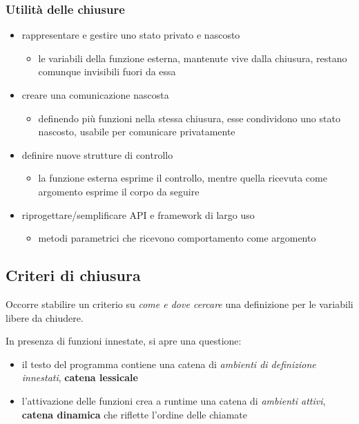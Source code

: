 \subsubsection{Utilità delle chiusure}
\begin{itemize}
    \item rappresentare e gestire uno stato privato e nascosto
    \begin{itemize}
        \item le variabili della funzione esterna, mantenute vive dalla chiusura, restano comunque invisibili fuori da essa
    \end{itemize}
    \item creare una comunicazione nascosta
    \begin{itemize}
        \item definendo più funzioni nella stessa chiusura, esse condividono uno stato nascosto, usabile per comunicare privatamente
    \end{itemize}
    \item definire nuove strutture di controllo
    \begin{itemize}
        \item la funzione esterna esprime il controllo, mentre quella ricevuta come argomento esprime il corpo da seguire
    \end{itemize}
    \item riprogettare/semplificare API e framework di largo uso
    \begin{itemize}
        \item metodi parametrici che ricevono comportamento come argomento
    \end{itemize}
\end{itemize}

\subsection{Criteri di chiusura}

Occorre stabilire un criterio su \textit{come e dove cercare} una definizione per le variabili libere da chiudere.

In presenza di funzioni innestate, si apre una questione:
\begin{itemize}
    \item il testo del programma contiene una catena di \textit{ambienti di definizione innestati}, \textbf{catena lessicale}
    \item l'attivazione delle funzioni crea a runtime una catena di \textit{ambienti attivi}, \textbf{catena dinamica} che riflette l'ordine delle chiamate
\end{itemize}

